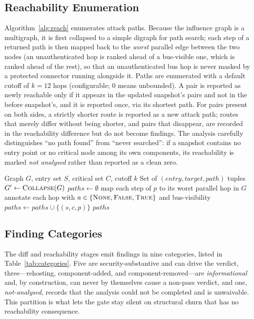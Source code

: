 \documentclass[journal]{IEEEtran}
\begin{document}
\subsection{Reachability Enumeration}
\label{subsec:reach}
Algorithm~\ref{alg:reach} enumerates attack paths. Because the influence graph
is a multigraph, it is first collapsed to a simple digraph for path search; each
step of a returned path is then mapped back to the \emph{worst} parallel edge
between the two nodes (an unauthenticated hop is ranked ahead of a bus-visible
one, which is ranked ahead of the rest), so that an unauthenticated bus hop is
never masked by a protected connector running alongside it. Paths are
enumerated with a default cutoff of $k=12$ hops (configurable; $0$ means
unbounded). A pair is reported as newly reachable only if it appears in the
updated snapshot's pairs and not in the before snapshot's, and it is reported
once, via its shortest path. For pairs present on both sides, a strictly shorter
route is reported as a new attack path; routes that merely differ without being
shorter, and pairs that disappear, are recorded in the reachability difference
but do not become findings. The analysis carefully distinguishes ``no path
found'' from ``never searched'': if a snapshot contains no entry point or no
critical node among its own components, its reachability is marked
\emph{not analysed} rather than reported as a clean zero.

\begin{algorithm}[t]
\caption{Attack-Path Enumeration (one snapshot)}
\label{alg:reach}
\begin{algorithmic}[1]
\Require Graph $G$, entry set $S$, critical set $C$, cutoff $k$
\Ensure Set of $(\mathit{entry},\mathit{target},\mathit{path})$ tuples
\State $G' \gets \Call{Collapse}{G}$ 
\State $\mathit{paths} \gets \emptyset$
      \State map each step of $p$ to its worst parallel hop in $G$
      \State annotate each hop with $a\in\{\textsc{None},\textsc{False},\textsc{True}\}$ and bus-visibility
      \State $\mathit{paths} \gets \mathit{paths}\cup\{(s,c,p)\}$
    \EndFor
  \EndFor
\EndFor
\State \Return $\mathit{paths}$
\end{algorithmic}
\end{algorithm}

\subsection{Finding Categories}
\label{subsec:findings}
The diff and reachability stages emit findings in nine categories, listed in
Table~\ref{tab:categories}. Five are security-substantive and can drive the
verdict, three---rehosting, component-added, and component-removed---are
\emph{informational} and, by construction, can never by themselves cause a
non-pass verdict, and one, \emph{not-analysed}, records that the analysis could
not be completed and is unwaivable. This partition is what lets the gate stay
silent on structural churn that has no reachability consequence.
\end{document}
